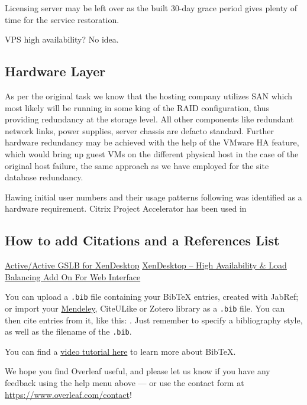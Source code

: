 \documentclass[a4paper]{article}
\begin{document}
	Licensing server may be left over as the built 30-day grace period gives plenty of time for the service restoration.
	
	VPS high availability? No idea.         
	
	\subsection{Hardware Layer}
	
	As per the original task we know that the hosting company utilizes SAN which most likely will be running in some king of the RAID configuration, thus providing redundancy at the storage level. All other components like redundant network links, power supplies, server chassis are defacto standard. Further hardware redundancy may be achieved with the help of the VMware HA feature, which would bring up guest VMs on the different physical host in the case of the original host failure, the same approach as we have employed for the site database redundancy.
	
	Hawing initial user numbers and their usage patterns following was identified as a hardware requirement. Citrix Project Accelerator has been used in  
	
	
	\subsection{How to add Citations and a References List}
	\href{https://www.citrix.com/blogs/2014/04/09/activeactive-gslb-for-xendesktop-a-practical-approach-part-1/}{Active/Active GSLB for XenDesktop}
	\href{https://www.citrix.com/blogs/2012/11/24/xendesktop-high-availability-load-balancing-add-on-for-web-interface/}{XenDesktop – High Availability \& Load Balancing Add On For Web Interface}
	
	You can upload a \verb|.bib| file containing your BibTeX entries, created with JabRef; or import your \href{https://www.overleaf.com/blog/184}{Mendeley}, CiteULike or Zotero library as a \verb|.bib| file. You can then cite entries from it, like this: \cite{greenwade93}. Just remember to specify a bibliography style, as well as the filename of the \verb|.bib|.
	
	You can find a \href{https://www.overleaf.com/help/97-how-to-include-a-bibliography-using-bibtex}{video tutorial here} to learn more about BibTeX.
	
	We hope you find Overleaf useful, and please let us know if you have any feedback using the help menu above --- or use the contact form at \url{https://www.overleaf.com/contact}!
	
	
	
	
\end{document}
